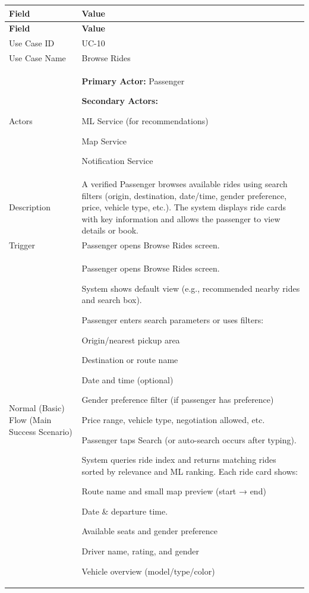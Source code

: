 \begin{longtable}{|p{3.5cm}|p{12cm}|}
\hline
\rowcolor{lightgray!30}
\textbf{Field} & \textbf{Value} \\
\hline
\endfirsthead
\hline
\rowcolor{lightgray!30}
\textbf{Field} & \textbf{Value} \\
\hline
\endhead
\hline
\endfoot
Use Case ID & UC-10 \\
\hline
Use Case Name & Browse Rides \\
\hline
Actors &
\textbf{Primary Actor:} Passenger

\textbf{Secondary Actors:}

ML Service (for recommendations)

Map Service

Notification Service \\
\hline
Description &
A verified Passenger browses available rides using search filters (origin, destination, date/time, gender preference, price, vehicle type, etc.). The system displays ride cards with key information and allows the passenger to view details or book. \\
\hline
Trigger &
Passenger opens Browse Rides screen. \\
\hline
Normal (Basic) Flow (Main Success Scenario) &
Passenger opens Browse Rides screen.

System shows default view (e.g., recommended nearby rides and search box).

Passenger enters search parameters or uses filters:

Origin/nearest pickup area

Destination or route name

Date and time (optional)

Gender preference filter (if passenger has preference)

Price range, vehicle type, negotiation allowed, etc.

Passenger taps Search (or auto-search occurs after typing).

System queries ride index and returns matching rides sorted by relevance and ML ranking. Each ride card shows:

Route name and small map preview (start → end)

Date \& departure time.

Available seats and gender preference

Driver name, rating, and gender

Vehicle overview (model/type/color)


\end{longtable}
